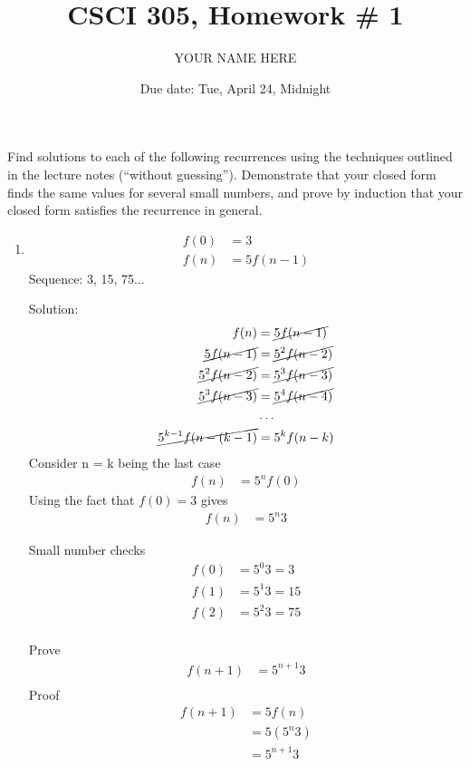 \documentclass{article}
\title{CSCI 305, Homework \# 1}
\author{YOUR NAME HERE}
\date{Due date: Tue, April 24, Midnight}
\begin{document}
\maketitle

Find solutions to each of the following recurrences
using the techniques outlined in the lecture notes (``without guessing'').
Demonstrate that your closed form finds the same values for several
small numbers, and prove by induction that your closed form satisfies
the recurrence in general.

\begin{enumerate}
\item
  \begin{align*}
    f(0) &= 3\\
    f(n) &= 5f(n-1)
  \end{align*}
  Sequence:
  3, 15, 75...

  Solution:
  \begin{align*}
    f(n) &= \cancel{5f(n-1)}\\
    \cancel{5f(n-1)} &= \cancel{5^2f(n-2)}\\
    \cancel{5^2f(n-2)} &= \cancel{5^3f(n-3)}\\
    \cancel{5^3f(n-3)} &= \cancel{5^4f(n-4)}\\
    &\ldots\\
    \cancel{5^{k-1}f(n-(k-1)} &= 5^{k}f(n-k)
  \end{align*}
    Consider n = k being the last case
  \begin{align*}
    f(n) &= 5^{n}f(0)
  \end{align*}
  Using the fact that $f(0)=3$ gives 
  \begin{align*}
    f(n) &= 5^{n}3
  \end{align*}

  Small number checks
  \begin{align*}
    f(0) &= 5^{0}3 = 3\\
    f(1) &= 5^{1}3 = 15\\
    f(2) &= 5^{2}3 = 75\\
  \end{align*}


  Prove
  \begin{align*}
    f(n + 1) &= 5^{n + 1}3 \\
  \end{align*}    
  Proof
  \begin{align*}
    f(n + 1) &= 5f(n) \\    
    &= 5(5^n3) \\
    &= 5^{n + 1}3 \\
  \end{align*}



\end{enumerate}
\end{document}
